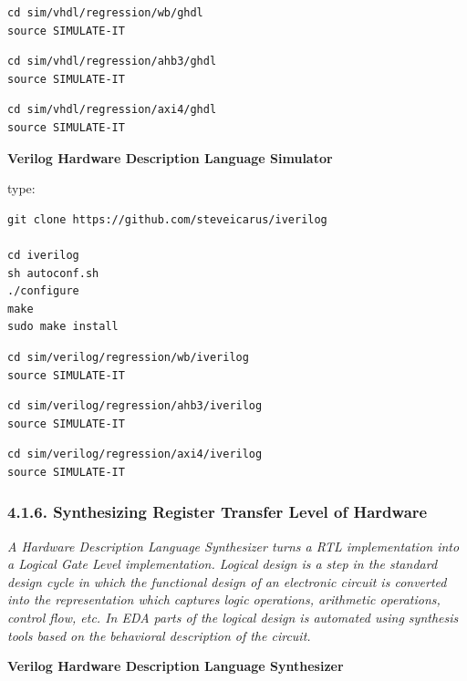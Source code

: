 \documentclass[
]{article}
\begin{document}
\begin{verbatim}
cd sim/vhdl/regression/wb/ghdl
source SIMULATE-IT
\end{verbatim}

\begin{verbatim}
cd sim/vhdl/regression/ahb3/ghdl
source SIMULATE-IT
\end{verbatim}

\begin{verbatim}
cd sim/vhdl/regression/axi4/ghdl
source SIMULATE-IT
\end{verbatim}

\textbf{Verilog Hardware Description Language Simulator}

type:

\begin{verbatim}
git clone https://github.com/steveicarus/iverilog

cd iverilog
sh autoconf.sh
./configure
make
sudo make install
\end{verbatim}

\begin{verbatim}
cd sim/verilog/regression/wb/iverilog
source SIMULATE-IT
\end{verbatim}

\begin{verbatim}
cd sim/verilog/regression/ahb3/iverilog
source SIMULATE-IT
\end{verbatim}

\begin{verbatim}
cd sim/verilog/regression/axi4/iverilog
source SIMULATE-IT
\end{verbatim}

\hypertarget{synthesizing-register-transfer-level-of-hardware}{%
\subsubsection{4.1.6. Synthesizing Register Transfer Level of
Hardware}\label{synthesizing-register-transfer-level-of-hardware}}

\emph{A Hardware Description Language Synthesizer turns a RTL
implementation into a Logical Gate Level implementation. Logical design
is a step in the standard design cycle in which the functional design of
an electronic circuit is converted into the representation which
captures logic operations, arithmetic operations, control flow, etc. In
EDA parts of the logical design is automated using synthesis tools based
on the behavioral description of the circuit.}

\textbf{Verilog Hardware Description Language Synthesizer}
\end{document}
